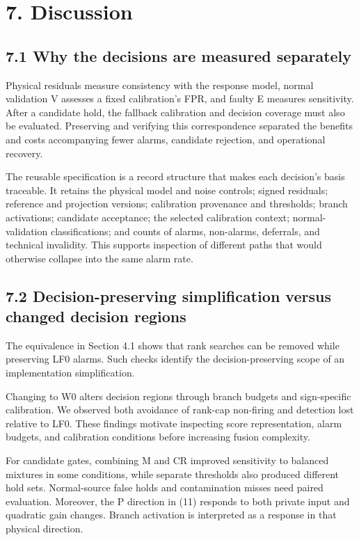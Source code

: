 \documentclass[10pt,a4paper]{article}
\newlength{\usable}
\begin{document}
\section{7. Discussion}

\subsection{7.1 Why the decisions are measured separately}

Physical residuals measure consistency with the response model, normal validation V assesses a fixed calibration's FPR, and faulty E measures sensitivity. After a candidate hold, the fallback calibration and decision coverage must also be evaluated. Preserving and verifying this correspondence separated the benefits and costs accompanying fewer alarms, candidate rejection, and operational recovery.

The reusable specification is a record structure that makes each decision's basis traceable. It retains the physical model and noise controls; signed residuals; reference and projection versions; calibration provenance and thresholds; branch activations; candidate acceptance; the selected calibration context; normal-validation classifications; and counts of alarms, non-alarms, deferrals, and technical invalidity. This supports inspection of different paths that would otherwise collapse into the same alarm rate.

\subsection{7.2 Decision-preserving simplification versus changed decision regions}

The equivalence in Section 4.1 shows that rank searches can be removed while preserving LF0 alarms. Such checks identify the decision-preserving scope of an implementation simplification.

Changing to W0 alters decision regions through branch budgets and sign-specific calibration. We observed both avoidance of rank-cap non-firing and detection lost relative to LF0. These findings motivate inspecting score representation, alarm budgets, and calibration conditions before increasing fusion complexity.

For candidate gates, combining M and CR improved sensitivity to balanced mixtures in some conditions, while separate thresholds also produced different hold sets. Normal-source false holds and contamination misses need paired evaluation. Moreover, the P direction in (11) responds to both private input and quadratic gain changes. Branch activation is interpreted as a response in that physical direction.
\end{document}
